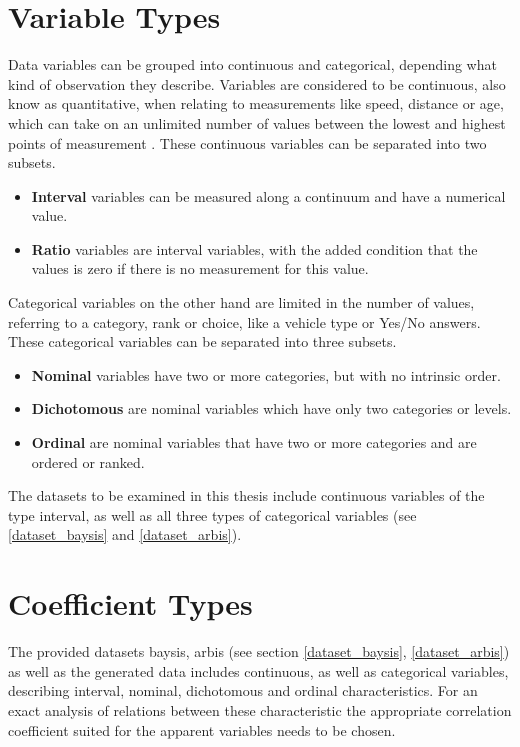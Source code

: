 \documentclass[a4paper,12pt]{report}
\begin{document}
\section{Variable Types}
\label{correlation_variable_types}
Data variables can be grouped into continuous and categorical, depending what kind of observation they describe. Variables are considered to be continuous, also know as quantitative, when relating to measurements like speed, distance or age, which can take on an unlimited number of values between the lowest and highest points of measurement \cite{McCue2007}. These continuous variables can be separated into two subsets. 

\begin{itemize}
	\item \textbf{Interval} variables can be measured along a continuum and have a numerical value. \cite{Laerd2020}
    \item \textbf{Ratio} variables are interval variables, with the added condition that the values is zero if there is no measurement for this value. \cite{Laerd2020}
\end{itemize}

Categorical variables on the other hand are limited in the number of values, referring to a category, rank or choice, like a vehicle type or Yes/No answers. These categorical variables can be separated into three subsets.

\begin{itemize}
	\item \textbf{Nominal} variables have two or more categories, but with no intrinsic order. \cite{Laerd2020}
	\item \textbf{Dichotomous} are nominal variables which have only two categories or levels. \cite{Laerd2020}
    \item \textbf{Ordinal} are nominal variables that have two or more categories and are ordered or ranked. \cite{Laerd2020}
\end{itemize}

The datasets to be examined in this thesis include continuous variables of the type interval, as well as all three types of categorical variables (see \ref{dataset_baysis} and \ref{dataset_arbis}).

\section{Coefficient Types}
\label{correlation_coefficient_types}
The provided datasets \acrshort{baysis}, \acrshort{arbis} (see section \ref{dataset_baysis}, \ref{dataset_arbis}) as well as the generated data  includes continuous, as well as categorical variables, describing interval, nominal, dichotomous and ordinal characteristics. For an exact analysis of relations between these characteristic the appropriate correlation coefficient suited for the apparent variables needs to be chosen.
\end{document}
